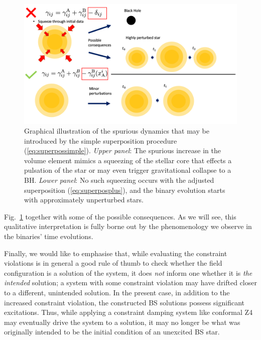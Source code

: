 \documentclass[]{iopart}
\begin{document}
\begin{figure}[t]
    \centering
    \includegraphics[width=350pt]{BosonStarTrick.png}
    \caption{
    Graphical illustration of the spurious dynamics that
    may be introduced by the simple superposition
    procedure (\ref{eq:superpossimple}). {\it Upper panel}:
    The spurious
    increase in the volume element mimics a squeezing of the
    stellar core that effects a pulsation of the star or
    may even trigger gravitational collapse to a BH.
    {\it Lower panel}: No such squeezing occurs with the
    adjusted superposition (\ref{eq:superposplus}),
    and the binary evolution starts with approximately
    unperturbed stars.
    }
    \label{fig:Overview}
\end{figure}
%
Fig.~\ref{fig:Overview} together with some of the possible
consequences.
As we will see, this qualitative interpretation is fully borne out
by the phenomenology we observe in the binaries' time evolutions.

Finally, we would like to emphasise that, while evaluating the constraint violations is in general a good rule of thumb to check whether the field configuration is a solution of the system, it does \emph{not} inform one whether it is \emph{the intended} solution; a system with some constraint violation may have drifted closer to a different, unintended solution. In the present case, in addition to the  increased constraint violation, the constructed BS solutions possess significant excitations. Thus, while applying a constraint damping system like conformal Z4
\cite{Bernuzzi:2009ex,Alic:2011gg}
may eventually drive the system to a solution, it may no longer be what was originally intended to be the initial condition of an unexcited BS star.


\end{document}
